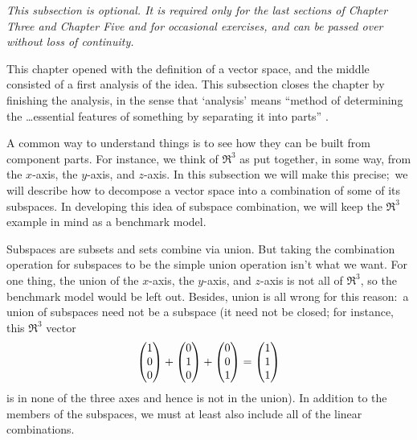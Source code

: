 






















\textit{This subsection is optional.
It is required only for the last sections of
Chapter Three and Chapter Five and for occasional exercises, and can
be passed over without loss of continuity.}

This chapter opened with the definition of a vector space, and the middle
consisted of a first analysis of the idea.
This subsection closes the chapter by finishing the analysis, in the sense
that `analysis' means ``method of determining the \ldots essential
features of something by separating it into parts'' \cite{MacmillanDict}.

A common way to understand things is to see how they can be built from 
component parts.
For instance, we think of \( \Re^3 \) as put together, in some way,
from the \( x \)-axis, the \( y \)-axis, and \( z \)-axis.
In this subsection we will make this precise;~we will describe 
how to decompose a vector space into a combination of
some of its subspaces.
In developing this idea of subspace combination, we will keep the $\Re^3$
example in mind as a benchmark model.

Subspaces are subsets and sets combine via union.
But taking the combination operation for subspaces to be the simple union
operation  isn't what we want.
For one thing, the union of the 
\( x \)-axis, the \( y \)-axis, and \( z \)-axis is not all of $\Re^3$,
so the benchmark model would be left out.
Besides, union is all wrong for this reason:~a union of subspaces need not be
a subspace (it need not be closed; for instance, this $\Re^3$ vector 
\begin{equation*}
  \begin{pmatrix} 1 \\ 0 \\ 0 \end{pmatrix}
  +
  \begin{pmatrix} 0 \\ 1 \\ 0 \end{pmatrix}
  +
  \begin{pmatrix} 0 \\ 0 \\ 1 \end{pmatrix}
  =
  \begin{pmatrix} 1 \\ 1 \\ 1 \end{pmatrix}
\end{equation*}
is in none of the three axes and hence is not in the union).
In addition to the members of the subspaces, we must at least also
include all of the linear combinations.

